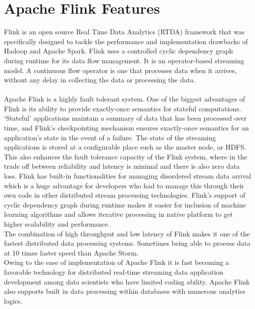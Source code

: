 \section{Apache Flink Features} 
Flink is an open source Real Time Data Analytics (RTDA) framework that was specifically designed to tackle the performance and implementation drawbacks of Hadoop and Apache Spark. Flink uses a controlled cyclic dependency graph during runtime for its data flow management. It is an operator-based streaming model. A continuous flow operator is one that processes data when it arrives, without any delay in collecting the data or processing the data\cite{link5}.
\\\\
Apache Flink is a highly fault tolerant system. One of the biggest advantages of Flink is its ability to provide exactly-once semantics for stateful computations. ‘Stateful' applications maintain a summary of data that has been processed over time, and Flink's checkpointing mechanism ensures exactly-once semantics for an application's state in the event of a failure. The state of the streaming applications is stored at a configurable place such as the master node, or HDFS. This also enhances the fault tolerance capacity of the Flink system, where in the trade off between reliability and latency is minimal and there is also zero data loss. Flink has built-in functionalities for managing disordered stream data arrival which is a huge advantage for developers who had to manage this through their own code in other distributed stream processing technologies. Flink's support of cyclic dependency graph during runtime makes it easier for inclusion of machine learning algorithms and allows iterative processing in native platform to get higher scalability and performance.\\
The combination of high throughput and low latency of Flink makes it one of the fastest distributed data processing  systems. Sometimes being able to process data at 10 times faster speed than Apache Storm.\\
Owing to the ease of implementation of Apache Flink it is fast becoming a favorable technology for distributed real-time streaming data application development among data scientists who have limited coding ability. Apache Flink also supports built in data processing within databases with numerous analytics logics.~\cite{link3} \\


